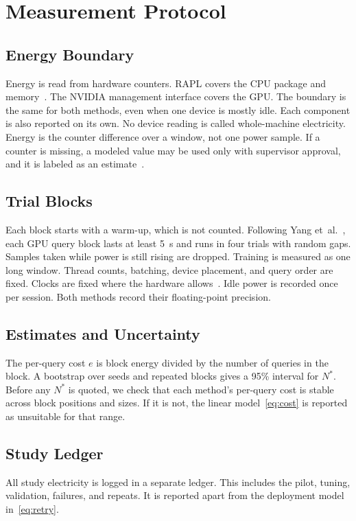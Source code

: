 \documentclass[conference]{IEEEtran}
\newcommand{\Nstar}{N^{\ast}}
\begin{document}
\section{Measurement Protocol}\label{sec:measure}

\subsection{Energy Boundary}
Energy is read from hardware counters. RAPL covers the CPU package and memory~\cite{henderson2020,khan2018}. The NVIDIA management interface covers the GPU. The boundary is the same for both methods, even when one device is mostly idle. Each component is also reported on its own. No device reading is called whole-machine electricity. Energy is the counter difference over a window, not one power sample. If a counter is missing, a modeled value may be used only with supervisor approval, and it is labeled as an estimate~\cite{lacoste2019}.

\subsection{Trial Blocks}
Each block starts with a warm-up, which is not counted. Following Yang et~al.~\cite{yang2024}, each GPU query block lasts at least 5~s and runs in four trials with random gaps. Samples taken while power is still rising are dropped. Training is measured as one long window. Thread counts, batching, device placement, and query order are fixed. Clocks are fixed where the hardware allows~\cite{yoo2026,mlperfpower2025}. Idle power is recorded once per session. Both methods record their floating-point precision.

\subsection{Estimates and Uncertainty}
The per-query cost $e$ is block energy divided by the number of queries in the block. A bootstrap over seeds and repeated blocks gives a 95\% interval for $\Nstar$. Before any $\Nstar$ is quoted, we check that each method's per-query cost is stable across block positions and sizes. If it is not, the linear model~\eqref{eq:cost} is reported as unsuitable for that range.

\subsection{Study Ledger}
All study electricity is logged in a separate ledger. This includes the pilot, tuning, validation, failures, and repeats. It is reported apart from the deployment model in~\eqref{eq:retry}.
\end{document}
